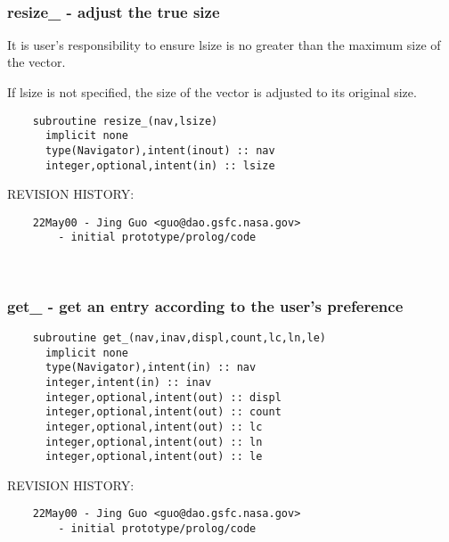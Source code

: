  
\mbox{}\hrulefill\ 
 

 \subsubsection{resize\_ - adjust the true size}


 
 
        It is user's responsibility to ensure lsize is no greater than
    the maximum size of the vector.
 
        If lsize is not specified, the size of the vector is adjusted
    to its original size.
 
 
\begin{verbatim} 
    subroutine resize_(nav,lsize)
      implicit none
      type(Navigator),intent(inout) :: nav
      integer,optional,intent(in) :: lsize
 \end{verbatim}{\sf REVISION HISTORY:}
\begin{verbatim}  	22May00	- Jing Guo <guo@dao.gsfc.nasa.gov>
 		- initial prototype/prolog/code\end{verbatim}
 
 
\mbox{}\hrulefill\ 
 

 \subsubsection{get\_ - get an entry according to the user's preference}


 
 
\begin{verbatim} 
    subroutine get_(nav,inav,displ,count,lc,ln,le)
      implicit none
      type(Navigator),intent(in) :: nav
      integer,intent(in) :: inav
      integer,optional,intent(out) :: displ
      integer,optional,intent(out) :: count
      integer,optional,intent(out) :: lc
      integer,optional,intent(out) :: ln
      integer,optional,intent(out) :: le
 \end{verbatim}{\sf REVISION HISTORY:}
\begin{verbatim}  	22May00	- Jing Guo <guo@dao.gsfc.nasa.gov>
 		- initial prototype/prolog/code\end{verbatim}
 
 
